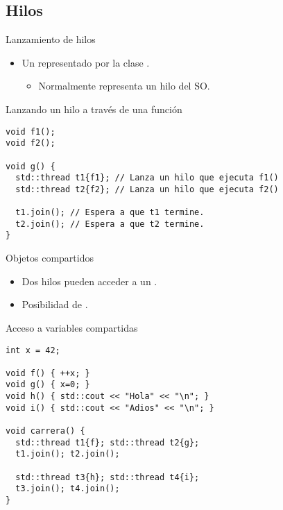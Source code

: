 \subsection{Hilos}

\begin{frame}[fragile]{Lanzamiento de hilos}
\begin{itemize}
  \item Un  representado por la clase .
    \begin{itemize}
      \item Normalmente representa un hilo del SO.
    \end{itemize}
\end{itemize}

\begin{block}{Lanzando un hilo a través de una función}
\begin{lstlisting}
void f1();
void f2();

void g() {
  std::thread t1{f1}; // Lanza un hilo que ejecuta f1()
  std::thread t2{f2}; // Lanza un hilo que ejecuta f2()

  t1.join(); // Espera a que t1 termine.
  t2.join(); // Espera a que t2 termine.
}
\end{lstlisting}
\end{block}
\end{frame}


\begin{frame}[fragile]{Objetos compartidos}
\begin{itemize}
  \item Dos hilos pueden acceder a un .
  \item Posibilidad de .
\end{itemize}

\begin{block}{Acceso a variables compartidas}
\begin{lstlisting}
int x = 42;

void f() { ++x; }
void g() { x=0; }
void h() { std::cout << "Hola" << "\n"; }
void i() { std::cout << "Adios" << "\n"; }

void carrera() {
  std::thread t1{f}; std::thread t2{g};
  t1.join(); t2.join();

  std::thread t3{h}; std::thread t4{i};
  t3.join(); t4.join();
}
\end{lstlisting}
\end{block}
\end{frame}

